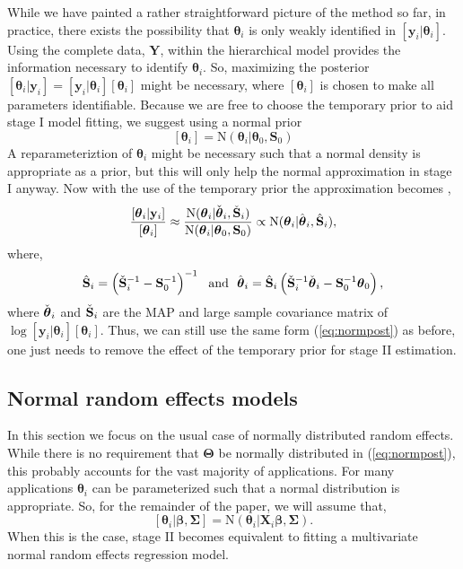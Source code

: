 \documentclass[12pt]{article}
\newcommand{\by}{\mathbf{y}}
\newcommand{\bt}{\boldsymbol{\theta}}
\newcommand{\bb}{\boldsymbol{\beta}}
\newcommand{\bT}{\boldsymbol{\Theta}}
\newcommand{\bSig}{\boldsymbol{\Sigma}}
\newcommand{\bS}{\mathbf{S}}
\newcommand{\bX}{\mathbf{X}}
\newcommand{\bY}{\mathbf{Y}}
\begin{document}
While we have painted a rather straightforward picture of the method so far, in practice, there exists the possibility that $\bt_i$ is only weakly identified in $[\by_i|\bt_i]$. Using the complete data, $\bY$, within the hierarchical model provides the information necessary to identify $\bt_i$. So, maximizing the posterior $[\bt_i|\by_i] = [\by_i|\bt_i][\bt_i]$ might be necessary, where $[\bt_i]$ is chosen to make all parameters identifiable. Because we are free to choose the temporary prior to aid stage I model fitting, we suggest using a normal prior
\[
[\bt_i] = \text{N}(\bt_i|\bt_0, \bS_0)
\]
A reparameteriztion of $\bt_i$ might be necessary such that a normal density is appropriate as a prior, but this will only help the normal approximation in stage I anyway. Now with the use of the temporary prior the approximation becomes \citep{goudie2019joining},
\begin{equation}
\label{eq:pseudo.prior}
\frac{[\bt_i|\by_i]}{[\bt_i]} \approx \frac{\text{N}(\bt_i|\Check{\bt}_i, \Check{\bS}_i)}{\text{N}(\bt_i|\bt_0, \bS_0)} \propto \text{N}(\bt_i|\hat{\bt}_i, \hat{\bS}_i),
\end{equation}
where,
\begin{equation}
\label{eq:pprior.remove}
\hat{\bS}_i = \left(\Check{\bS}_i^{-1} - \bS_0^{-1}\right)^{-1} 
\ \ \text{and}\ \ 
\hat{\bt}_i = \hat{\bS}_i \left(  \Check{\bS}_i^{-1}\Check{\bt}_i -  \bS_0^{-1}\bt_0\right),
\end{equation}
where $\Check{\bt}_i$ and $\Check{\bS}_i$ are the MAP and large sample covariance matrix of $\log [\by_i|\bt_i][\bt_i]$. Thus, we can still use the same form (\ref{eq:normpost}) as before, one just needs to remove the effect of the temporary prior for stage II estimation. 


\subsection{Normal random effects models}

In this section we focus on the usual case of normally distributed random effects. While there is no requirement that $\bT$ be normally distributed in (\ref{eq:normpost}), this probably accounts for the vast majority of applications. For many applications $\bt_i$ can be parameterized such that a normal distribution is appropriate. So, for the remainder of the paper, we will assume that, 
\[
[\bt_i|\bb, \bSig] = \text{N}(\bt_i|\bX_i\bb, \bSig).
\]
When this is the case, stage II becomes equivalent to fitting a multivariate normal random effects regression model. 
\end{document}
